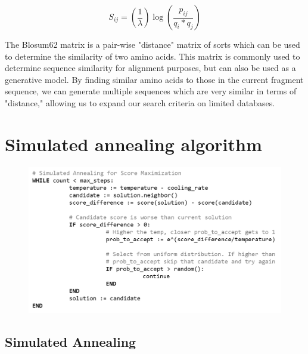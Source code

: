 \documentclass{article}
\begin{document}
\begin{enumerate}
\begin{equation*}
S_{ij}= \left( \frac{1}{\lambda} \right)\log{\left( \frac{p_{ij}}{q_i * q_j} \right)}
    \end{equation*}

The Blosum62 matrix is a pair-wise "distance" matrix of sorts which can be used to determine the similarity of two amino acids. This matrix is commonly used to determine sequence similarity for alignment purposes, but can also be used as a generative model. By finding similar amino acids to those in the current fragment sequence, we can generate multiple sequences which are very similar in terms of "distance," allowing us to expand our search criteria on limited databases.



\section{Simulated annealing algorithm}

\begin{figure}[H]
\begin{center}
\includegraphics[width=\textwidth]{sa}
\label{Fig:blosum}
\end{center}
\end{figure}

\subsection{Simulated Annealing}


\end{enumerate}
\end{document}
